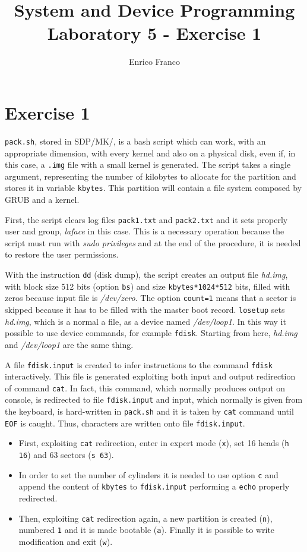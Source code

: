 \documentclass{report}
\author{Enrico Franco}
\title{System and Device Programming \\
	Laboratory 5 - Exercise 1}
\begin{document}
\section*{Exercise 1}
\texttt{pack.sh}, stored in SDP/MK/, is a bash script which can work, with an appropriate dimension, with every kernel and also on a physical disk, even if, in this case, a \texttt{.img} file with a small kernel is generated. The script takes a single argument, representing the number of kilobytes to allocate for the partition and stores it in variable \texttt{kbytes}. This partition will contain a file system composed by GRUB and a kernel.

First, the script clears log files \texttt{pack1.txt} and \texttt{pack2.txt} and it sets properly user and group, \emph{laface} in this case. This is a necessary operation because the script must run with \emph{sudo privileges} and at the end of the procedure, it is needed to restore the user permissions.

With the instruction \texttt{dd} (disk dump), the script creates an output file \emph{hd.img}, with block size 512 bits (option \texttt{bs}) and size \texttt{kbytes*1024*512} bits, filled with zeros because input file is \emph{/dev/zero}. The option \texttt{count=1} means that a sector is skipped because it has to be filled with the master boot record. \texttt{losetup} sets \emph{hd.img}, which is a normal a file, as a device named \emph{/dev/loop1}. In this way it possible to use device commands, for example \texttt{fdisk}. Starting from here, \emph{hd.img} and \emph{/dev/loop1} are the same thing.

A file \texttt{fdisk.input} is created to infer instructions to the command \texttt{fdisk} interactively. This file is generated exploiting both input and output redirection of command \texttt{cat}. In fact, this command, which normally produces output on console, is redirected to file \texttt{fdisk.input} and input, which normally is given from the keyboard, is hard-written in \texttt{pack.sh} and it is taken by \texttt{cat} command until \texttt{EOF} is caught. Thus, characters are written onto file \texttt{fdisk.input}.

\begin{itemize}
\item First, exploiting \texttt{cat} redirection, enter in expert mode (\texttt{x}), set 16 heads (\texttt{h 16}) and 63 sectors (\texttt{s 63}).
\item In order to set the number of cylinders it is needed to use option \texttt{c} and append the content of \texttt{kbytes} to \texttt{fdisk.input} performing a \texttt{echo} properly redirected.
\item Then, exploiting \texttt{cat} redirection again, a new partition is created (\texttt{n}), numbered \texttt{1} and it is made bootable (\texttt{a}). Finally it is possible to write modification and exit (\texttt{w}). 
\end{itemize}
\end{document}
